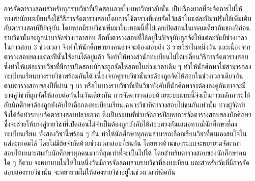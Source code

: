 \maketitle
\makesignature

\ifproject
\begin{abstractTH}
การจัดตารางสอบสำหรับทุกรายวิชาที่เปิดสอนภายในมหาวิทยาลัยนั้น
เป็นเรื่องยากที่จะจัดการไม่ให้ 
ทางสำนักทะเบียนจึงใช้วิธีการจัดตารางสอบโดยการใช้ตารางที่เคยจัดไว้แล้วในแต่ละปีมาปรับใช้เพิ่มเติมกับตารางสอบปีปัจจุบัน 
โดยหากมีรายวิชาเพิ่มมาในเทอมนี้ที่ไม่เคยเปิดสอนในเทอมเดียวกันของปีก่อน รายวิชานั้นจะถูกนำมาจัดช่วงเวลาสอบ อีกทั้งตารางสอบที่ใช้อยู่ในปัจจุบันถูกจัดให้แต่ละวันมีช่วงเวลาในการสอบ 3 ช่วงเวลา
จึงทำให้นักศึกษาบางคนอาจจะต้องสอบถึง 3 รายวิชาในหนึ่งวัน และเนื่องจากตารางสอบของแต่ละปีนั้นใช้งานได้อยู่แล้ว
จึงทำให้ทางสำนักทะเบียนไม่ได้เปลี่ยนวิธีการจัดตารางสอบ ซึ่งทำให้แต่ละรายวิชาที่มีการเปิดสอนมักจะถูกจัดให้สอบในช่วงเวลาเดิม ๆ
ทำให้นักศึกษาไม่สามารถลงทะเบียนเรียนบางรายวิชาพร้อมกันได้ เนื่องจากคู่รายวิชานั้นจะต้องถูกจัดให้สอบในช่วงเวลาเดียวกันตามตารางสอบของปีที่ผ่าน ๆ มา 
หรือในบางรายวิชาที่เป็นวิชาบังคับที่นักศึกษาจะต้องลงคู่กันอาจจะมีบางคู่วิชาที่ถูกจัดให้สอบต่อกันในวันเดียวกัน
การจัดตารางสอบด้วยระบบแบบนี้จึงเป็นการผลักภาระให้กับนักศึกษาต้องถูกบังคับให้เลือกลงทะเบียนเรียนเฉพาะวิชาที่ตารางสอบไม่ชนกันเท่านั้น 
ทางผู้จัดทำจึงได้จัดทำระบบจัดตารางสอบปลายภาค ซึ่งเป็นระบบที่ช่วยจัดการปัญหาการจัดตารางสอบของนักศึกษา
 ซึ่งจะช่วยให้บางคู่รายวิชาที่เปิดสอนไม่จำเป็นต้องถูกบังคับให้สอบตรงกันเสมอหากมีนักศึกษาที่ลงทะเบียนเรียน
ทั้งสองวิชานี้พร้อม ๆ กัน ทำให้นักศึกษาทุกคนสามารถเลือกเรียนวิชาที่ตนเองสนใจในแต่ละเทอมได้ โดยไม่มีข้อจำกัดด้วยช่วงเวลาสอบที่ชนกัน
โดยทางด้านของระบบจะพยายามจัดเวลาสอบให้เหมาะสมกับนักศึกษาทุกคนมากที่สุดเท่าที่จะเป็นไปได้ โดยสำหรับตารางสอบของนักศึกษาคนใด ๆ ก็ตาม 
จะพยายามไม่ให้ในหนึ่งวันมีการจัดสอบสามรายวิชาที่ลงทะเบียน และสำหรับวันที่มีการจัดสอบสองรายวิชานั้น จะพยายามไม่ให้สองรายวิชาอยู่ในช่วงเวลาที่ติดกัน
\end{abstractTH}
